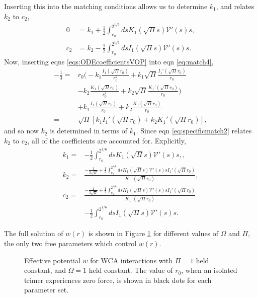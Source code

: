 \documentclass[twocolumn,amsmath,amssymb,aps]{revtex4-1}%
\begin{document}
Inserting this into the matching conditions allows us to determine $k_1$, and
relates $k_2$ to $c_2$,
\begin{subequations}
  \label{eqs:specificmatching}
  \begin{align}
    0 &= k_1 + \frac{1}{2}\int_{r_0}^{2^{1/6}}dsK_1(\sqrt{\Pi}s)
        \mathcal{V}'(s)s,\label{eq:specificmatch1}\\
    c_2  &= k_2 - \frac{1}{2}\int_{r_0}^{2^{1/6}}dsI_1(\sqrt{\Pi}s)
           \mathcal{V}'(s)s\label{eq:specificmatch2}.
  \end{align}
\end{subequations}
Now, inserting eqns \ref{eqs:ODEcoefficientsVOP} into eqn \ref{eq:match4},
\begin{align}
  -\frac{1}{3}=
  &r_0\bigg(-k_1\frac{I_1(\sqrt{\Pi}r_0)}{r_0^2}+k_1\sqrt{\Pi}
    \frac{I_1'(\sqrt{\Pi}r_0)}{r_0}\nonumber\\
  &-k_2\frac{K_1(\sqrt{\Pi}r_0)}{r_0^2}+k_2\sqrt{\Pi}
    \frac{K_1'(\sqrt{\Pi}r_0)}{r_0}\bigg)\nonumber\\
  & +k_1\frac{I_1(\sqrt{\Pi}r_0)}{r_0} + k_2\frac{K_1(\sqrt{\Pi}r_0)}{r_0}
    \nonumber\\
  =&\sqrt{\Pi}[k_1I_1'(\sqrt{\Pi}r_0)+k_2K_1'(\sqrt{\Pi}r_0)],
\end{align}
and so now $k_2$ is determined in terms of $k_1$. Since eqn
\ref{eq:specificmatch2} relates $k_2$ to $c_2$, all of the coefficients are
accounted for. Explicitly,
\begin{align}
  k_1 =& -\frac{1}{2}\int_{r_0}^{2^{1/6}}dsK_1(\sqrt{\Pi}s)
         \mathcal{V}'(s)s,\label{eq:k1},\\
  k_2 =& \frac{-\frac{1}{3\sqrt{\Pi}}+\frac{1}{2}\int_{r_0}^{2^{1/6}}ds
         K_1(\sqrt{\Pi}s)\mathcal{V}'(s)sI_1'(\sqrt{\Pi}r_0)}
         {K_1'(\sqrt{\Pi}r_0)}\label{eq:k2},\\
  c_2 =& \frac{-\frac{1}{3\sqrt{\Pi}}+\frac{1}{2}\int_{r_0}^{2^{1/6}}ds
         K_1(\sqrt{\Pi}s)\mathcal{V}'(s)sI_1'(\sqrt{\Pi}r_0)}
         {K_1'(\sqrt{\Pi}r_0)}\nonumber\\
       &-\frac{1}{2}\int_{r_0}^{2^{1/6}}dsI_1(\sqrt{\Pi}s)
         \mathcal{V}'(s)s\label{eq:c2}.
\end{align}

The full solution of $w(r)$ is shown in Figure \ref{fig:3} for different
values of $\Omega$ and $\Pi$, the only two free parameters which control
$w(r)$.

\begin{figure}[!t]
  \subfloat{\label{fig:3b}}
  \caption{Effective potential $w$ for WCA interactions with
    \protect{} $\Pi=1$ held constant, and
    \protect{} $\Omega=1$ held constant. The value of $r_0$,
    when an isolated trimer experiences zero force, is shown in black dots
    for each parameter set.
  }\label{fig:3}
\end{figure}
\end{document}
